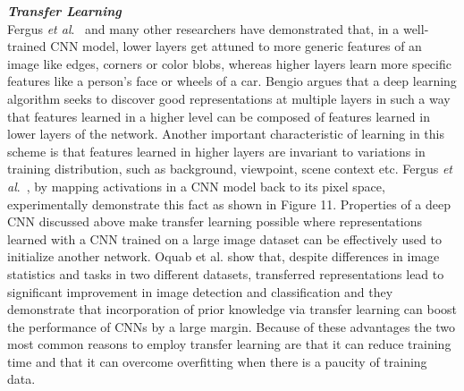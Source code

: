 \documentclass [11pt,letterpaper ,openany ]{report}
\begin{document}
    \noindent
    \textbf{\textit{Transfer Learning}}\\
    Fergus \textit {et al}.\ \cite{zeiler2014visualizing} and many other researchers \cite{bengio2012deep, oquab2014learning} have demonstrated that, in a well-trained CNN model, lower layers get attuned to more generic features of an image like edges, corners or color blobs, whereas higher layers learn more specific features like a person's face or wheels of a car. Bengio \cite{bengio2012deep} argues that a deep learning algorithm seeks to discover good representations at multiple layers  in such a way that features learned in a higher level can be composed of features learned in lower layers of the network. Another important characteristic of learning in this scheme is that features learned in higher layers are invariant to variations in training distribution, such as background, viewpoint, scene context etc. Fergus \textit{et al}.\ \cite{zeiler2014visualizing}, by mapping activations in a CNN model back to its pixel space, experimentally demonstrate this fact as shown in Figure 11. Properties of a deep CNN discussed above make transfer learning possible where representations learned with a CNN trained on a large image dataset can be effectively used to  initialize another network. Oquab et al. \cite{oquab2014learning} show that, despite differences in image statistics and tasks in two different datasets, transferred representations lead to significant improvement in image detection and classification and they demonstrate that incorporation of prior knowledge via transfer learning can boost the performance of CNNs by a large margin. Because of these advantages the two most common reasons to employ transfer learning are that it can reduce training time and that it can overcome overfitting when there is a paucity of training data.
\end{document}
